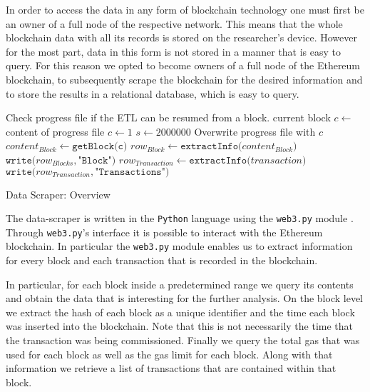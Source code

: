In order to access the data in any form of blockchain technology one must first be an owner of a full node of the respective network. This means that the whole blockchain data with all its records is stored on the researcher's device. However for the most part, data in this form is not stored in a manner that is easy to query. For this reason we opted to become owners of a full node of the Ethereum blockchain, to subsequently scrape the blockchain for the desired information and to store the results in a relational database, which is easy to query.


\begin{algorithm}[h]
\begin{algorithmic}
\State Check progress file if the ETL can be resumed from a block.
    \State current block $c \gets$ content of progress file
\Else
    \State $c \gets 1$
\EndIf
\State $s \gets 2000000$ 
   \State Overwrite progress file with $c$ 
   \State $content_{Block} \gets \texttt{getBlock(c)}$
   \State $row_{Block} \gets \texttt{extractInfo(}content_{Block}\texttt{)}$
   \State $\texttt{write(} row_{Blocks}, \texttt{"Block")}$
       \State $row_{Transaction} \gets \texttt{extractInfo(}transaction\texttt{)}$
       \State $\texttt{write(} row_{Transaction}, \texttt{"Transactions")}$
   \EndFor
\EndWhile
\end{algorithmic}
\caption{Data Scraper: Overview}
\label{etl}
\end{algorithm}


The data-scraper is written in the \texttt{Python} language using the \texttt{web3.py} module \cite{Python, web3}. Through \texttt{web3.py}'s interface it is possible to interact with the Ethereum blockchain. In particular the \texttt{web3.py} module enables us to extract information for every block and each transaction that is recorded in the blockchain.

In particular, for each block inside a predetermined range we query its contents and obtain the data that is interesting for the further analysis. On the block level we extract the hash of each block as a unique identifier and the time each block was inserted into the blockchain. Note that this is not necessarily the time that the transaction was being commissioned. Finally we query the total gas that was used for each block as well as the gas limit for each block. Along with that information we retrieve a list of transactions that are contained within that block.

